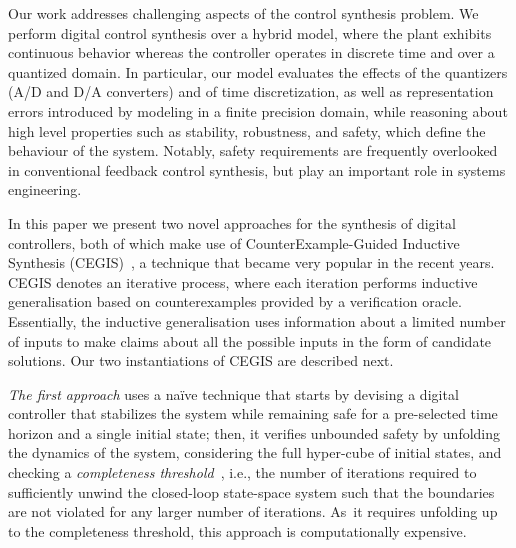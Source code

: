 \documentclass[twocolumn]{autart}    %
\begin{document}
Our work addresses challenging aspects of the control synthesis
problem.  We perform digital control synthesis over a hybrid model,
where the plant exhibits continuous behavior whereas the controller
operates in discrete time and over a quantized domain.  In particular,
our model evaluates the effects of the quantizers (A/D and D/A
converters) and of time discretization, as well as representation
errors introduced by modeling %
in a finite precision domain, while reasoning about high level
properties such as stability, robustness, and safety, which define the
behaviour of the system.  Notably, safety requirements are
frequently overlooked in conventional feedback control synthesis, but
play an important role in systems engineering.

In this paper we present two novel approaches for the synthesis of
digital controllers, both of which make use of CounterExample-Guided
Inductive Synthesis (CEGIS)~\cite{jha-icse10,
  DBLP:conf/asplos/Solar-LezamaTBSS06}, a technique
that became very popular in the recent years.  CEGIS denotes an
iterative process, where each iteration performs inductive
generalisation based on counterexamples provided by a verification
oracle. Essentially, the inductive generalisation uses information
about a limited number of inputs to make claims about all the possible
inputs in the form of candidate solutions. Our two instantiations of
CEGIS are described next.

{\em The first approach} uses a na\"ive technique that starts by devising a
digital controller that stabilizes the system while remaining safe for a
pre-selected time horizon and a single initial state; then, it verifies
unbounded safety by unfolding the dynamics of the system, considering the
full hyper-cube of initial states, and checking a {\em completeness
threshold}~\cite{DBLP:conf/vmcai/KroeningS03}, i.e., the number of
iterations required to sufficiently unwind the closed-loop state-space
system such that the boundaries are not violated for any larger number of
iterations.  As~it requires unfolding up to the completeness threshold, this
approach is computationally expensive.
\end{document}

